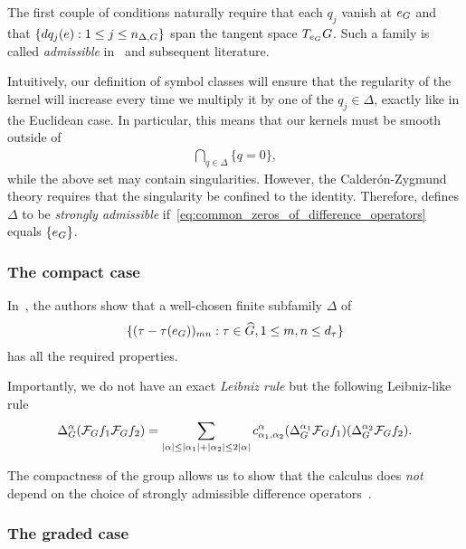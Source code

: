 The first couple of conditions naturally require that each $q_j$ vanish at $e_G$ and that $\{dq_j(e) : 1 \leq j \leq n_{\Delta, G}\}$ span the tangent space $T_{e_G} G$.
Such a family is called \emph{admissible} in~\cite{RuzhanskyTurunenWirth10} and subsequent literature.

Intuitively,
our definition of symbol classes will ensure that the regularity of the kernel will increase every time we multiply it by one of the $q_j \in \Delta$,
exactly like in the Euclidean case.
In particular,
this means that our kernels must be smooth outside of
\begin{align}
    \bigcap_{q \in \Delta} \{q = 0\},
    \label{eq:common_zeros_of_difference_operators}
\end{align}
while the above set may contain singularities.
However,
the Calder\'on-Zygmund theory requires that the singularity be confined to the identity.
Therefore,
\cite{RuzhanskyTurunenWirth10} defines $\Delta$ to be \emph{strongly admissible}
if~\eqref{eq:common_zeros_of_difference_operators} equals $\{e_G\}$.

\subsubsection*{The compact case}

In~\cite{RuzhanskyTurunenWirth10},
the authors show that a well-chosen finite subfamily $\Delta$ of
\begin{align*}
    \{(\tau - \tau(e_G))_{m n} : \tau \in {\widehat{G}}, 1 \leq m, n \leq {d_{\tau}}\}
\end{align*}
has all the required properties.

Importantly,
we do not have an exact \emph{Leibniz rule}
but the following Leibniz-like rule
\begin{align*}
    {\Delta_{G}^{\alpha}} (\mathcal{F}_{G} f_1 \mathcal{F}_{G} f_2)
    = \sum_{\left|{\alpha}\right| \leq \left|{\alpha_1}\right| + \left|{\alpha_2}\right| \leq 2 \left|{\alpha}\right|}
    c^\alpha_{\alpha_1, \alpha_2}
    ({\Delta_{G}^{\alpha_1}} \mathcal{F}_{G} f_1)
    ({\Delta_{G}^{\alpha_2}} \mathcal{F}_{G} f_2).
\end{align*}

The compactness of the group allows us to show that the calculus does \emph{not} depend on the choice of strongly admissible difference operators~\cite{RuzhanskyTurunenWirth10,Fischer2015}.

\subsubsection*{The graded case}

